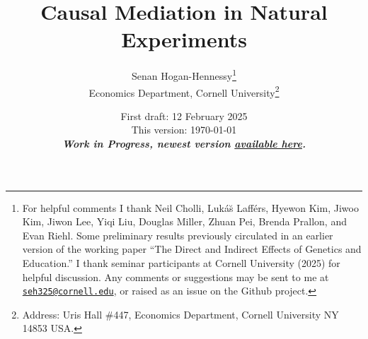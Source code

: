 \documentclass[notitlepage,12pt]{article}
\author{Senan Hogan-Hennessy\thanks{
    For helpful comments I thank
    Neil Cholli,
    Luk\'a\u{s} Laff\'ers,
    Hyewon Kim,
    Jiwoo Kim,
    Jiwon Lee,
    Yiqi Liu,
    Douglas Miller,
    Zhuan Pei,
    Brenda Prallon,
    and
    Evan Riehl.
    Some preliminary results previously circulated in an earlier version of the working paper ``The Direct and Indirect Effects of Genetics and Education.''
    I thank seminar participants at Cornell University (2025) for helpful discussion.
    Any comments or suggestions may be sent to me at \href{mailto:seh325@cornell.edu}{\nolinkurl{seh325@cornell.edu}}, or raised as an issue on the Github project.
    } \\
    \vspace{0.1cm}
    Economics Department, Cornell University\footnote{
        Address: Uris Hall \#447, Economics Department, Cornell University NY 14853 USA.
    }
}
\title{Causal Mediation in Natural Experiments}
\date{
    First draft: 12 February 2025 \\
    This version:
    \today \\ \vspace{0.25cm}
    \textbf{\textit{Work in Progress,
    newest version
    \href{https://github.com/shoganhennessy/mediation-natural-experiment/blob/main/mediation-natural-experiment-2025.pdf}{available here}.}}
    \vspace{-1.0cm}
}
\begin{document}
\clearpage
\maketitle
\thispagestyle{empty}
\begin{abstract}
    
\end{abstract}

\newpage
\setcounter{page}{1}
\doublespacing
\noindent



% 



\singlespacing


\newpage

\end{document}
